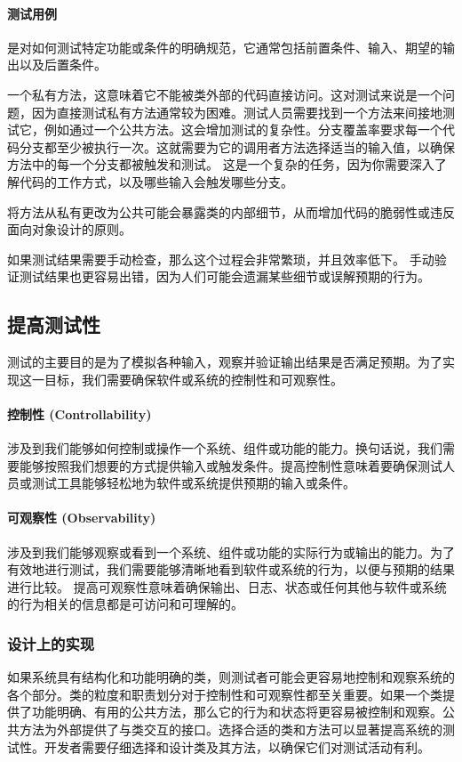\documentclass[]{ctexbook}
\begin{document}
\paragraph{测试用例}是对如何测试特定功能或条件的明确规范，它通常包括前置条件、输入、期望的输出以及后置条件。

一个私有方法，这意味着它不能被类外部的代码直接访问。这对测试来说是一个问题，因为直接测试私有方法通常较为困难。测试人员需要找到一个方法来间接地测试它，例如通过一个公共方法。这会增加测试的复杂性。分支覆盖率要求每一个代码分支都至少被执行一次。这就需要为它的调用者方法选择适当的输入值，以确保方法中的每一个分支都被触发和测试。
这是一个复杂的任务，因为你需要深入了解代码的工作方式，以及哪些输入会触发哪些分支。

将方法从私有更改为公共可能会暴露类的内部细节，从而增加代码的脆弱性或违反面向对象设计的原则。

如果测试结果需要手动检查，那么这个过程会非常繁琐，并且效率低下。
手动验证测试结果也更容易出错，因为人们可能会遗漏某些细节或误解预期的行为。

\subsection{提高测试性}
测试的主要目的是为了模拟各种输入，观察并验证输出结果是否满足预期。为了实现这一目标，我们需要确保软件或系统的控制性和可观察性。

\paragraph{控制性 (Controllability)}涉及到我们能够如何控制或操作一个系统、组件或功能的能力。换句话说，我们需要能够按照我们想要的方式提供输入或触发条件。提高控制性意味着要确保测试人员或测试工具能够轻松地为软件或系统提供预期的输入或条件。

\paragraph{可观察性 (Observability)}
涉及到我们能够观察或看到一个系统、组件或功能的实际行为或输出的能力。为了有效地进行测试，我们需要能够清晰地看到软件或系统的行为，以便与预期的结果进行比较。
提高可观察性意味着确保输出、日志、状态或任何其他与软件或系统的行为相关的信息都是可访问和可理解的。

\subsubsection{设计上的实现}
如果系统具有结构化和功能明确的类，则测试者可能会更容易地控制和观察系统的各个部分。类的粒度和职责划分对于控制性和可观察性都至关重要。如果一个类提供了功能明确、有用的公共方法，那么它的行为和状态将更容易被控制和观察。公共方法为外部提供了与类交互的接口。选择合适的类和方法可以显著提高系统的测试性。开发者需要仔细选择和设计类及其方法，以确保它们对测试活动有利。
\end{document}
